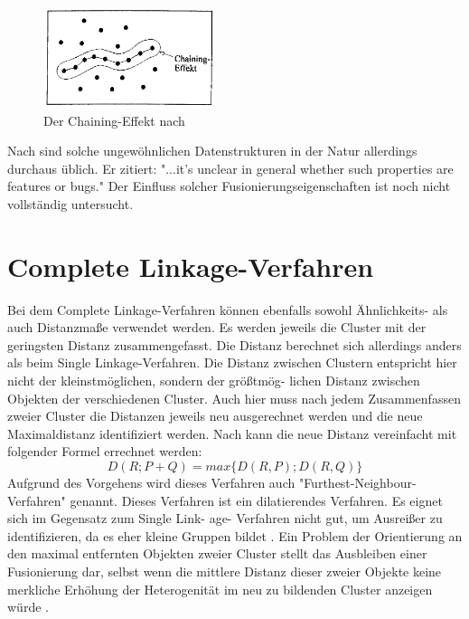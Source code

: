 \begin{figure}[h]
	\begin{center}
		\includegraphics[width=5cm]{pics/klemm19.png}
	\end{center}
	\caption{Der Chaining-Effekt nach \citet[S. 19]{Klemm.1995}}
	\label{pic:klemm19}
\end{figure}

Nach \citet[S. 416]{Clarke.2009} sind solche ungewöhnlichen Datenstrukturen in der Natur allerdings durchaus üblich. Er zitiert: "...it's unclear in general whether such properties are features or bugs."  Der Einfluss solcher Fusionierungseigenschaften ist noch nicht vollständig untersucht.

\section{Complete Linkage-Verfahren}
Bei dem Complete Linkage-Verfahren können ebenfalls sowohl Ähnlichkeits- als auch Distanzmaße verwendet werden. Es werden jeweils die Cluster mit der geringsten Distanz zusammengefasst. Die Distanz berechnet sich allerdings anders als beim Single Linkage-Verfahren. Die Distanz zwischen Clustern entspricht hier nicht der kleinstmöglichen, sondern der größtmög- \linebreak lichen Distanz zwischen Objekten der verschiedenen Cluster. Auch hier muss nach jedem Zusammenfassen zweier Cluster die Distanzen jeweils neu ausgerechnet werden und die neue Maximaldistanz identifiziert werden.
Nach \citet[S.483]{Backhaus.2016} kann die neue Distanz vereinfacht mit folgender Formel errechnet werden:                                                                                                                                                                                                                                                                                                                                                               
\begin{equation}
	D(R;P+Q) = max\{D(R,P);D(R,Q)\}
\end{equation}
Aufgrund des Vorgehens wird dieses Verfahren auch "Furthest-Neighbour-Verfahren" genannt.
Dieses Verfahren ist ein dilatierendes Verfahren. Es eignet sich im Gegensatz zum Single Link- \linebreak age- Verfahren nicht gut, um Ausreißer zu identifizieren, da es eher kleine Gruppen bildet \citep[Vgl.][S. 483/484]{Backhaus.2016}. Ein Problem der Orientierung an den maximal entfernten Objekten zweier Cluster stellt das Ausbleiben einer Fusionierung dar, selbst wenn die mittlere Distanz dieser zweier Objekte keine merkliche Erhöhung der Heterogenität im neu zu bildenden Cluster anzeigen würde \citep[Vgl.][S. 236]{Eckey.2002}.

